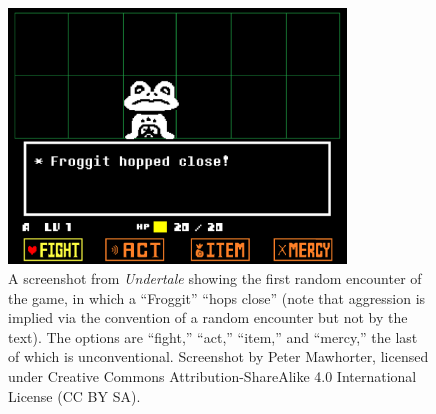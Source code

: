 \documentclass[arts,article,accept,moreauthors,pdftex,10pt,a4paper]{Definitions/mdpi}
\begin{document}
\begin{figure}[t]
  \centering
    \includegraphics[width=0.8\textwidth]{fig/froggit-hopped-close-narrow.png}
    \caption{A screenshot from \emph{Undertale} showing the first random encounter of the game, in which a ``Froggit'' ``hops close'' (note that aggression is implied via the convention of a random encounter but not by the text). The options are ``fight,'' ``act,'' ``item,'' and ``mercy,'' the last of which is unconventional. Screenshot by Peter Mawhorter, licensed under Creative Commons Attribution-ShareAlike 4.0 International License (CC BY SA).}
    
    \label{fig:UT_froggit}
\end{figure}
\end{document}
